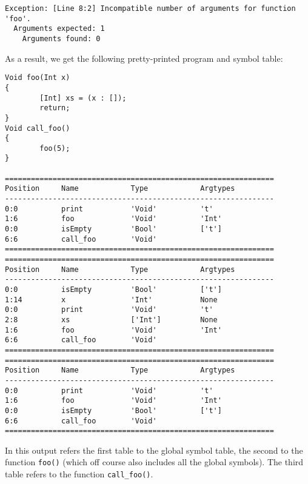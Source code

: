 \documentclass[a4paper]{article}
\begin{document}
\begin{verbatim}
Exception: [Line 8:2] Incompatible number of arguments for function 'foo'.
  Arguments expected: 1
    Arguments found: 0
\end{verbatim}

As a result, we get the following pretty-printed program and symbol table: 

\begin{verbatim}
Void foo(Int x)
{
        [Int] xs = (x : []);
        return;
}
Void call_foo()
{
        foo(5);
}

==============================================================
Position     Name            Type            Argtypes            
--------------------------------------------------------------
0:0          print           'Void'          't'                 
1:6          foo             'Void'          'Int'               
0:0          isEmpty         'Bool'          ['t']               
6:6          call_foo        'Void'                              
==============================================================
==============================================================
Position     Name            Type            Argtypes            
--------------------------------------------------------------
0:0          isEmpty         'Bool'          ['t']               
1:14         x               'Int'           None                
0:0          print           'Void'          't'                 
2:8          xs              ['Int']         None                
1:6          foo             'Void'          'Int'               
6:6          call_foo        'Void'                              
==============================================================
==============================================================
Position     Name            Type            Argtypes            
--------------------------------------------------------------
0:0          print           'Void'          't'                 
1:6          foo             'Void'          'Int'               
0:0          isEmpty         'Bool'          ['t']               
6:6          call_foo        'Void'                              
==============================================================
\end{verbatim}
In this output refers the first table to the global symbol table, the second to the function {\tt foo()} (which off course also includes all the global symbols). The third table refers to the function {\tt call\_foo()}.
\end{document}
